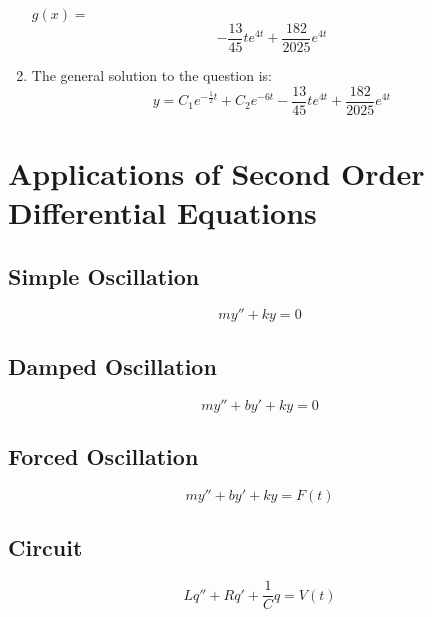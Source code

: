 \begin{example}{}{}
\begin{enumerate}
	$g(x)=$
	$$-\frac{13}{45}te^{4t}+\frac{182}{2025}e^{4t}$$
	
	\item The general solution to the question is:
	$$y=C_1e^{-\frac{1}{2}t}+C_2e^{-6t}-\frac{13}{45}te^{4t}+\frac{182}{2025}e^{4t}$$
	\end{enumerate}
	\end{example}
	
	\section{Applications of Second Order Differential Equations}
	\subsection{Simple Oscillation}
	\begin{equation}
	my''+ky=0
	\end{equation}
	\subsection{Damped Oscillation}
	\begin{equation}
	my''+by'+ky=0
	\end{equation}
	\subsection{Forced Oscillation}
	\begin{equation}
	my''+by'+ky=F(t)
	\end{equation}
	\subsection{Circuit}
	\begin{equation}
	Lq''+Rq'+\frac{1}{C}q=V(t)
	\end{equation}